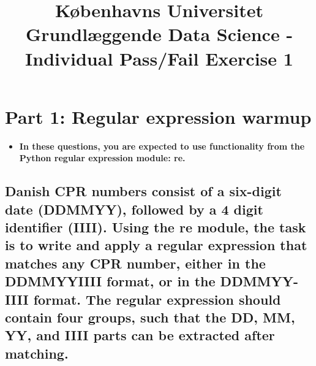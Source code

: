 \documentclass[a4paper,12pt]{article}
\begin{document}
% 

\title{Københavns Universitet\\
Grundlæggende Data Science - Individual Pass/Fail Exercise 1}
\maketitle %

\section{Part 1: Regular expression warmup}
\begin{itemize}
    \item []\textbf{In these questions, you are expected to use functionality from the Python regular expression module: re.}
\end{itemize}
\subsection[Danish CPR numbers]{Danish CPR numbers consist of a six-digit date (DDMMYY), followed by a 4 digit identifier (IIII). Using the re module, the task is to write and apply a regular expression that matches any CPR number, either in the DDMMYYIIII format, or in the DDMMYY-IIII format. The regular expression should contain four groups, such that the DD, MM, YY, and IIII parts can be extracted after matching.}
\end{document}
